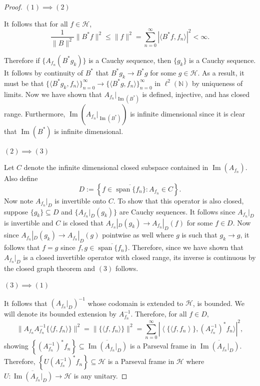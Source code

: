 \documentclass[11pt]{amsart}
\theoremstyle{definition}
\numberwithin{equation}{section}
\newcommand{\Hcal}{\mathcal{H}} %
\begin{document}
\begin{proof}
$(1)\implies (2)$

It follows that for all $f\in \Hcal$,
\begin{equation}\label{analysisopeq}
\frac{1}{\|B\|^{2}} \|B^{*}f\|^{2}\leq \|f \|^{2}=\sum_{n=0}^{\infty}|\langle B^{*}f, f_n\rangle|^{2}<\infty.  
\end{equation}

Therefore if $\{A_{f_n}(B^{*}g_k)\}$ is a Cauchy sequence, then $\{g_k\}$ is a Cauchy sequence. It follows by continuity of $B^{*}$ that $B^{*}g_k\to B^{*}g$ for some $g\in \Hcal$. As a result, it must be that $\{\langle B^{*}g_k, f_n\rangle\}_{n=0}^{\infty}\to \{\langle B^{*}g, f_n\rangle\}_{n=0}^{\infty}$ in $\ell^2(\mathbb{N})$ by uniqueness of limits. Now we have shown that $A_{f_n}|_{\operatorname{Im}(B^*)}$ is defined, injective, and has closed range. Furthermore, $\operatorname{Im}(A_{f_n}|_{\operatorname{Im}(B^*)})$ is infinite dimensional since it is clear that $\operatorname{Im}(B^{*})$ is infinite dimensional.

$(2)\implies (3)$

Let $C$ denote the infinite dimensional closed subspace contained in \newline $\operatorname{Im}(A_{f_n})$. Also define 
$$D:=\left\{f\in \overline{\operatorname{span}\{f_n\}}: A_{f_n}\in C \right\}.$$
Now note $A_{f_n}|_{D}$ is invertible onto $C$. To show that this operator is also closed, suppose $\{g_k\}\subseteq D$ and $\{A_{f_n}|_{D}(g_k)\}$ are Cauchy sequences. It follows since $A_{f_n}|_{D}$ is invertible and $C$ is closed that $A_{f_n}|_{D}(g_k)\to A_{f_n}|_{D}(f)$ for some $f\in D$. Now since $A_{f_n}|_{D}(g_k)\to A_{f_n}|_{D}(g)$ pointwise as well where $g$ is such that
$g_k\to g$, it follows that 
$f=g$ since $f,g\in \overline{\operatorname{span}\{f_n\}}$.
Therefore, since we have shown that $A_{f_n}|_{D}$ is a closed invertible operator with closed range, its inverse is continuous by the closed graph theorem and $(3)$ follows.

$(3)\implies (1)$

It follows that $(A_{f_n}|_{D})^{-1}$ whose codomain is extended to $\Hcal$, is bounded. We will denote its bounded extension by $A_{f_n}^{-1}$. Therefore, for all $f\in D,$
$$\|A_{f_n}A^{-1}_{f_n}\{\langle f, f_n\rangle\}\|^{2}=\|\{\langle f, f_n\rangle\}\|^{2}=\sum_{n=0}^{\infty}|\left\langle \{\langle f, f_n \right\rangle\},(A^{-1}_{f_n})^{*}f_n\rangle|^{2},$$ showing $\left\{(A^{-1}_{f_n})^{*}f_n \right\}\subseteq \overline{\operatorname{Im}(A_{f_n}|_{D})}$ is a Parseval frame in $\overline{\operatorname{Im}(A_{f_n}|_{D})}$. Therefore, $\left\{U(A^{-1}_{f_n})^{*}f_n \right\}\subseteq \Hcal$ is a Parseval frame in $\Hcal$ where $U: \overline{\operatorname{Im}(A_{f_n}|_{D})}\to \Hcal$ is any unitary.


\end{proof}
\end{document}
